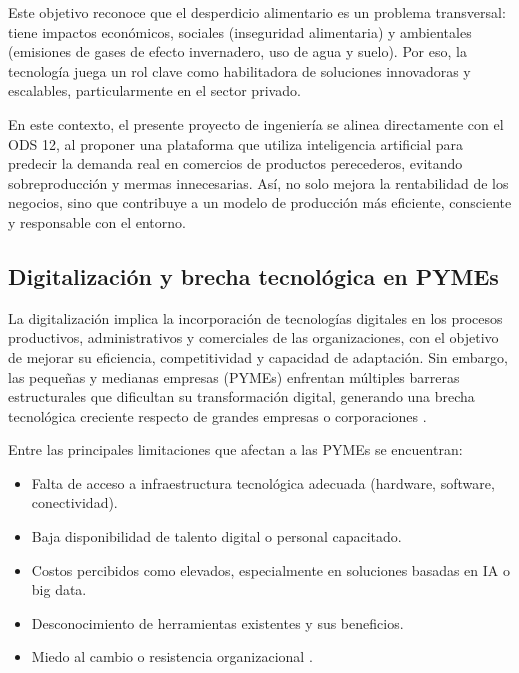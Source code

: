 Este objetivo reconoce que el desperdicio alimentario es un problema transversal: tiene impactos económicos, sociales (inseguridad alimentaria) y ambientales (emisiones de gases de efecto invernadero, uso de agua y suelo). Por eso, la tecnología juega un rol clave como habilitadora de soluciones innovadoras y escalables, particularmente en el sector privado.

En este contexto, el presente proyecto de ingeniería se alinea directamente con el ODS 12, al proponer una plataforma que utiliza inteligencia artificial para predecir la demanda real en comercios de productos perecederos, evitando sobreproducción y mermas innecesarias. Así, no solo mejora la rentabilidad de los negocios, sino que contribuye a un modelo de producción más eficiente, consciente y responsable con el entorno.

\subsection{Digitalización y brecha tecnológica en PYMEs}

 La digitalización implica la incorporación de tecnologías digitales en los procesos productivos, administrativos y comerciales de las organizaciones, con el objetivo de mejorar su eficiencia, competitividad y capacidad de adaptación. Sin embargo, las pequeñas y medianas empresas (PYMEs) enfrentan múltiples barreras estructurales que dificultan su transformación digital, generando una brecha tecnológica creciente respecto de grandes empresas o corporaciones \parencite{oecd2021}.

Entre las principales limitaciones que afectan a las PYMEs se encuentran:

\begin{itemize}
    \item Falta de acceso a infraestructura tecnológica adecuada (hardware, software, conectividad).
    \item Baja disponibilidad de talento digital o personal capacitado.
    \item Costos percibidos como elevados, especialmente en soluciones basadas en IA o big data.
    \item Desconocimiento de herramientas existentes y sus beneficios.
    \item Miedo al cambio o resistencia organizacional \parencite{jordao2022}.
\end{itemize}

